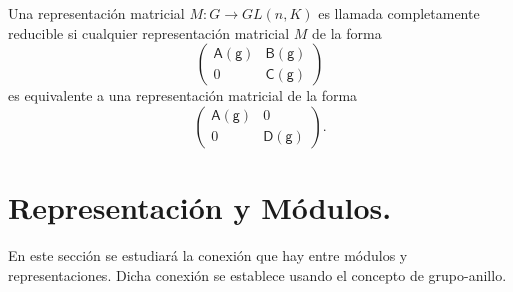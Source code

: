 \begin{definicion}
Una representación matricial $M \colon G \to GL(n,K)$ es llamada completamente reducible si cualquier representación matricial $M$ de la forma 
\begin{equation*} \begin{pmatrix}
\mathsf{A(g)} & \mathsf{B(g)} \\
0 & \mathsf{C(g)}
\end{pmatrix} \end{equation*} es equivalente a una representación matricial de la forma
\begin{equation*} \begin{pmatrix}
\mathsf{A(g)} & 0 \\
0 & \mathsf{D(g)} 
\end{pmatrix}. \end{equation*}
\end{definicion}


\section{\quad Representación y Módulos.}
 En este sección se estudiará la conexión que hay entre módulos y representaciones. Dicha conexión se establece usando el concepto de grupo-anillo.
 

